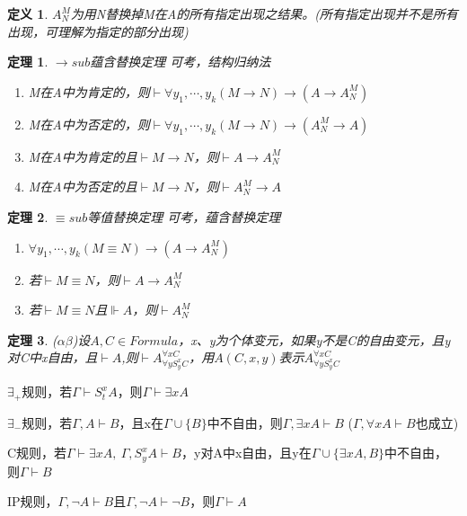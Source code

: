\documentclass[a4paper]{ctexart}
\newtheorem{thm}{\hspace{2em}定理}[subsection]
\newtheorem{defi}{\hspace{2em}定义}[subsection]
\newcommand{\shade}[1]{\colorbox{shadecolor}{#1}}
\begin{document}
\begin{defi}
  $A_N^M$为用N替换掉M在A的所有指定出现之结果。(所有指定出现并不是所有出现，可理解为指定的部分出现)
\end{defi}

\begin{thm}
  $\rightarrow sub$蕴含替换定理 \shade{可考，结构归纳法}
  \begin{enumerate}[itemindent=2em]
    \item M在A中为肯定的，则$\vdash\forall{y_1,\cdots,y_k}(M\rightarrow N)\rightarrow(A\rightarrow A_N^M)$
    \item M在A中为否定的，则$\vdash\forall{y_1,\cdots,y_k}(M\rightarrow N)\rightarrow(A_N^M\rightarrow A)$
    \item M在A中为肯定的且$\vdash M\rightarrow N$，则$\vdash A\rightarrow A_N^M$
    \item M在A中为否定的且$\vdash M\rightarrow N$，则$\vdash A_N^M\rightarrow A$
  \end{enumerate}
\end{thm}

\begin{thm}
  $\equiv sub$等值替换定理 \shade{可考，蕴含替换定理}
  \begin{enumerate}[itemindent=2em]
    \item $\forall{y_1,\cdots,y_k}(M\equiv N)\rightarrow(A\rightarrow A_N^M)$
    \item 若$\vdash M\equiv N$，则$\vdash A\rightarrow A_N^M$
    \item 若$\vdash M\equiv N$且$\Vdash A$，则$\vdash A_N^M$
  \end{enumerate}
\end{thm}

\begin{thm}
  ($\alpha\beta$)设$A,C\in Formula$，x、y为个体变元，如果y不是C的自由变元，且y对C中x自由，且$\vdash A$,则$\vdash A^{\forall{x}C}_{\forall{y}S_y^xC}$，用$A(C,x,y)$表示$A^{\forall{x}C}_{\forall{y}S_y^xC}$
\end{thm}

$\exists_+$规则，若$\Gamma\vdash S^x_tA$，则$\Gamma\vdash \exists{x}A$

\indent$\exists_-$规则，若$\Gamma,A\vdash B$，且x在$\Gamma\cup\{B\}$中不自由，则$\Gamma,\exists{x}A\vdash B$ ($\Gamma,\forall{x}A\vdash B$也成立)

C规则，若$\Gamma\vdash\exists{x}A,\ \Gamma,S^x_yA\vdash B$，y对A中x自由，且y在$\Gamma\cup\{\exists{x}A,B\}$中不自由，则$\Gamma\vdash B$

IP规则，$\Gamma,\neg A\vdash B$且$\Gamma,\neg A\vdash\neg B$，则$\Gamma\vdash A$
\end{document}
